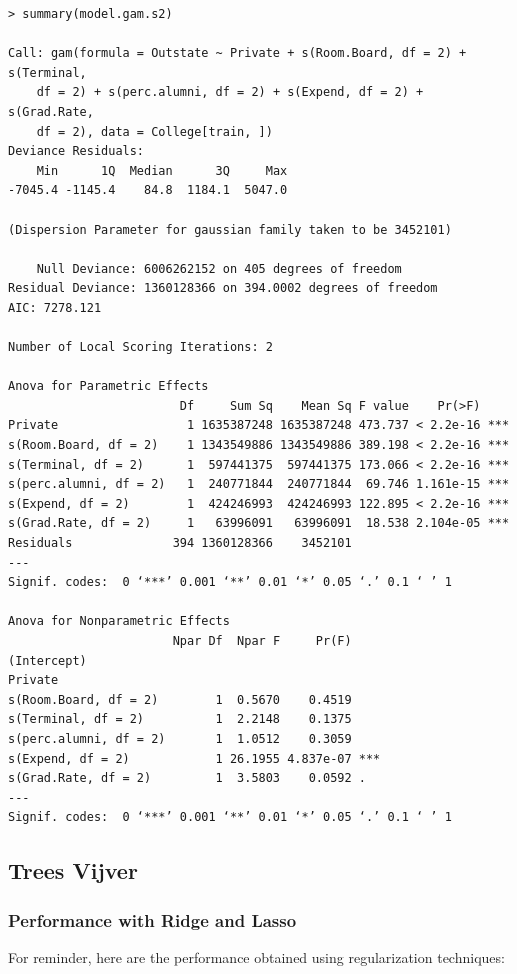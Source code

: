 \documentclass[11pt, a4paper]{article}
\begin{document}
\begin{verbatim}
> summary(model.gam.s2)

Call: gam(formula = Outstate ~ Private + s(Room.Board, df = 2) + s(Terminal, 
    df = 2) + s(perc.alumni, df = 2) + s(Expend, df = 2) + s(Grad.Rate, 
    df = 2), data = College[train, ])
Deviance Residuals:
    Min      1Q  Median      3Q     Max 
-7045.4 -1145.4    84.8  1184.1  5047.0 

(Dispersion Parameter for gaussian family taken to be 3452101)

    Null Deviance: 6006262152 on 405 degrees of freedom
Residual Deviance: 1360128366 on 394.0002 degrees of freedom
AIC: 7278.121 

Number of Local Scoring Iterations: 2 

Anova for Parametric Effects
                        Df     Sum Sq    Mean Sq F value    Pr(>F)    
Private                  1 1635387248 1635387248 473.737 < 2.2e-16 ***
s(Room.Board, df = 2)    1 1343549886 1343549886 389.198 < 2.2e-16 ***
s(Terminal, df = 2)      1  597441375  597441375 173.066 < 2.2e-16 ***
s(perc.alumni, df = 2)   1  240771844  240771844  69.746 1.161e-15 ***
s(Expend, df = 2)        1  424246993  424246993 122.895 < 2.2e-16 ***
s(Grad.Rate, df = 2)     1   63996091   63996091  18.538 2.104e-05 ***
Residuals              394 1360128366    3452101                      
---
Signif. codes:  0 ‘***’ 0.001 ‘**’ 0.01 ‘*’ 0.05 ‘.’ 0.1 ‘ ’ 1

Anova for Nonparametric Effects
                       Npar Df  Npar F     Pr(F)    
(Intercept)                                         
Private                                             
s(Room.Board, df = 2)        1  0.5670    0.4519    
s(Terminal, df = 2)          1  2.2148    0.1375    
s(perc.alumni, df = 2)       1  1.0512    0.3059    
s(Expend, df = 2)            1 26.1955 4.837e-07 ***
s(Grad.Rate, df = 2)         1  3.5803    0.0592 .  
---
Signif. codes:  0 ‘***’ 0.001 ‘**’ 0.01 ‘*’ 0.05 ‘.’ 0.1 ‘ ’ 1
\end{verbatim}
\subsection{Trees Vijver}
\label{sec-1-2}
\subsubsection{Performance with Ridge and Lasso}
\label{sec-1-2-1}

For reminder, here are the performance obtained using regularization
techniques:
\end{document}
